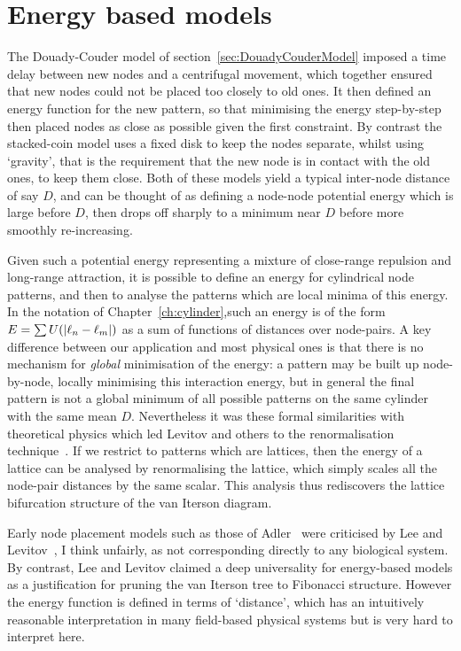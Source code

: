  


\section{Energy based models}
\label{sec:energy}
The Douady-Couder model of section~\ref{sec:DouadyCouderModel} imposed a time delay between new nodes and a centrifugal movement, which together ensured that new nodes could not be placed too closely to old ones. It then defined an energy function for the new pattern, so that minimising the energy step-by-step then placed nodes as close as possible given the first constraint.  By contrast the stacked-coin model uses a fixed disk to keep the nodes separate, whilst using `gravity', that is the requirement that the new node is in contact with the old ones, to keep them close. Both of these models yield  a typical inter-node distance of say $D$, and can be thought of as defining a  node-node potential energy which is large before $D$, then drops off sharply to a minimum near $D$ before more smoothly re-increasing. 

Given such a potential energy representing a mixture of close-range repulsion and long-range attraction, it is possible to define an energy for cylindrical node patterns, and then to analyse the patterns which are local minima of this energy. In the notation of Chapter~\ref{ch:cylinder},such an energy is of the form 
$E=\sum U(\left|\ell_{{n}}-\ell_{{m}}\right|)$ as a sum of  functions of distances over node-pairs.  {A key difference between our application and most physical ones is that there is no mechanism for \textit{global} minimisation of the energy: a pattern may be built up node-by-node, locally minimising this interaction energy, but in general the final pattern is not a global minimum of all possible patterns on the same cylinder with the same mean $D$.}
Nevertheless it was these formal similarities with theoretical physics which led Levitov and others to the renormalisation technique~\autocite{levitovFibonacciNumbersBotany1991}. If we restrict to patterns which are lattices, then the energy of a lattice can be analysed by renormalising the lattice, which simply scales all the node-pair distances by the same scalar. This analysis thus rediscovers the  lattice bifurcation structure of the van Iterson diagram.

 Early node placement models such as those of Adler~\autocite{adlerConsequencesContactPressure1977} were criticised by Lee and Levitov~\autocite{leeUniversalityPhyllotaxisMechanical1998}, I think unfairly, as not corresponding directly to any biological system. By contrast,
 Lee and Levitov claimed a deep universality for energy-based models as a justification for pruning the van Iterson tree to Fibonacci structure. However the energy function is defined in terms of `distance', which has an intuitively reasonable interpretation in many field-based physical systems but is very hard to interpret here.
 
